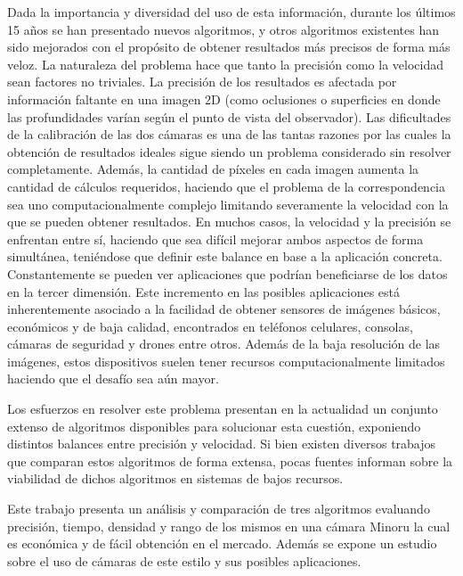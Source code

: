 \documentclass[11pt,a4paper,titlepage]{article}
\begin{document}
Dada la importancia y diversidad del uso de esta información, durante los últimos 15 años se han presentado nuevos algoritmos, y otros algoritmos existentes han sido mejorados con el propósito de obtener resultados más precisos de forma más veloz. La naturaleza del problema hace que tanto la precisión como la velocidad sean factores no triviales. La precisión de los resultados es afectada por información faltante en una imagen 2D (como oclusiones o superficies en donde las profundidades varían según el punto de vista del observador). Las dificultades de la calibración de las dos cámaras es una de las tantas razones por las cuales la obtención de resultados ideales sigue siendo un problema considerado sin resolver completamente. Además, la cantidad de píxeles en cada imagen aumenta la cantidad de cálculos requeridos, haciendo que el problema de la correspondencia sea uno computacionalmente complejo limitando severamente la velocidad con la que se pueden obtener resultados. En muchos casos, la velocidad y la precisión se enfrentan entre sí, haciendo que sea difícil mejorar ambos aspectos de forma simultánea, teniéndose que definir este balance en base a la aplicación concreta. Constantemente se pueden ver aplicaciones que podrían beneficiarse de los datos en la tercer dimensión. Este incremento en las posibles aplicaciones está inherentemente asociado a la facilidad de obtener sensores de imágenes básicos, económicos y de baja calidad, encontrados en teléfonos celulares, consolas, cámaras de seguridad y drones entre otros. Además de la baja resolución de las imágenes, estos dispositivos suelen tener recursos computacionalmente limitados haciendo que el desafío sea aún mayor.

Los esfuerzos en resolver este problema presentan en la actualidad un conjunto extenso de algoritmos disponibles para solucionar esta cuestión, exponiendo distintos balances entre precisión y velocidad. Si bien existen diversos trabajos que comparan estos algoritmos de forma extensa, pocas fuentes informan sobre la viabilidad de dichos algoritmos en sistemas de bajos recursos.

Este trabajo presenta un análisis y comparación de tres algoritmos evaluando precisión, tiempo, densidad y rango de los mismos en una cámara Minoru la cual es económica y de fácil obtención en el mercado. Además se expone un estudio sobre el uso de cámaras de este estilo y sus posibles aplicaciones.
\end{document}
